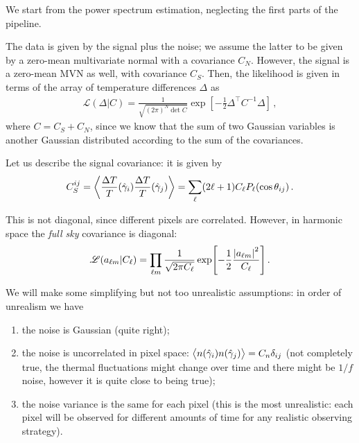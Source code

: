 \documentclass[main.tex]{subfiles}
\begin{document}

We start from the power spectrum estimation, neglecting the first parts of the pipeline. 

The data is given by the signal plus the noise; we assume the latter to be given by a zero-mean multivariate normal with a covariance \(C_N\). 
However, the signal is a zero-mean MVN as well, with covariance \(C_S\). 
Then, the likelihood is given in terms of the array of temperature differences \(\Delta \) as
%
\begin{align}
\mathscr{L} (\Delta |C) 
= \frac{1}{\sqrt{(2 \pi )^{N} \det C}}
\exp[- \frac{1}{2} \Delta^{\top} C^{-1} \Delta ]
\,,
\end{align}
%
where \(C = C_S + C_N\), since we know that the sum of two Gaussian variables is another Gaussian distributed according to the sum of the covariances. 

Let us describe the signal covariance: it is given by 
%
\begin{align}
C^{ij}_{S} = \expval{\frac{\Delta T}{T} (\hat{\gamma}_i)\frac{\Delta T}{T} (\hat{\gamma}_j)} = \sum _{\ell} (2 \ell + 1) C_\ell P_\ell (\cos \theta _{ij})
\,.
\end{align}

This is not diagonal, since different pixels are correlated. 
However, in harmonic space the \emph{full sky} covariance is diagonal: 
%
\begin{align}
\mathscr{L} (a_{\ell m} | C_\ell) = \prod_{\ell m} \frac{1}{\sqrt{2 \pi C_\ell}} \exp[- \frac{1}{2} \frac{\abs{a_{\ell m}}^2}{C_\ell}]
\,.
\end{align}

We will make some simplifying but not too unrealistic assumptions: in order of unrealism we have
\begin{enumerate}
    \item the noise is Gaussian (quite right);
    \item the noise is uncorrelated in pixel space: \(\expval{n(\hat{\gamma}_i) n (\hat{\gamma}_j)}= C_n \delta_{ij}\) (not completely true, the thermal fluctuations might change over time and there might be \(1/f\) noise, however it is quite close to being true);
    \item the noise variance is the same for each pixel (this is the most unrealistic: each pixel will be observed for different amounts of time for any realistic observing strategy).
\end{enumerate}
\end{document}
